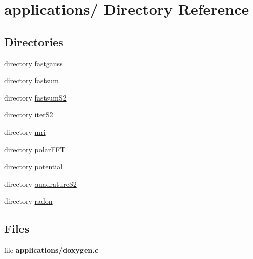 \hypertarget{dir_000006}{
\section{applications/ Directory Reference}
\label{dir_000006}
}
\subsection*{Directories}
\begin{CompactItemize}
\item 
directory \hyperlink{dir_000015}{fastgauss}
\item 
directory \hyperlink{dir_000016}{fastsum}
\item 
directory \hyperlink{dir_000011}{fastsum\-S2}
\item 
directory \hyperlink{dir_000012}{iter\-S2}
\item 
directory \hyperlink{dir_000007}{mri}
\item 
directory \hyperlink{dir_000013}{polar\-FFT}
\item 
directory \hyperlink{dir_000017}{potential}
\item 
directory \hyperlink{dir_000014}{quadrature\-S2}
\item 
directory \hyperlink{dir_000022}{radon}
\end{CompactItemize}
\subsection*{Files}
\begin{CompactItemize}
\item 
file {\bf applications/doxygen.c}
\end{CompactItemize}
